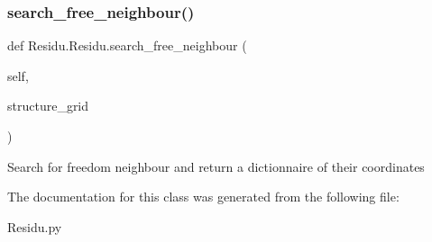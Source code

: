 \subsubsection{\texorpdfstring{search\+\_\+free\+\_\+neighbour()}{search\_free\_neighbour()}}
{\footnotesize\ttfamily def Residu.\+Residu.\+search\+\_\+free\+\_\+neighbour (\begin{DoxyParamCaption}\item[{}]{self,  }\item[{}]{structure\+\_\+grid }\end{DoxyParamCaption})}

\begin{DoxyVerb}Search for freedom neighbour and return a dictionnaire
    of their coordinates
\end{DoxyVerb}
 

The documentation for this class was generated from the following file\+:\begin{DoxyCompactItemize}
\item 
Residu.\+py\end{DoxyCompactItemize}
